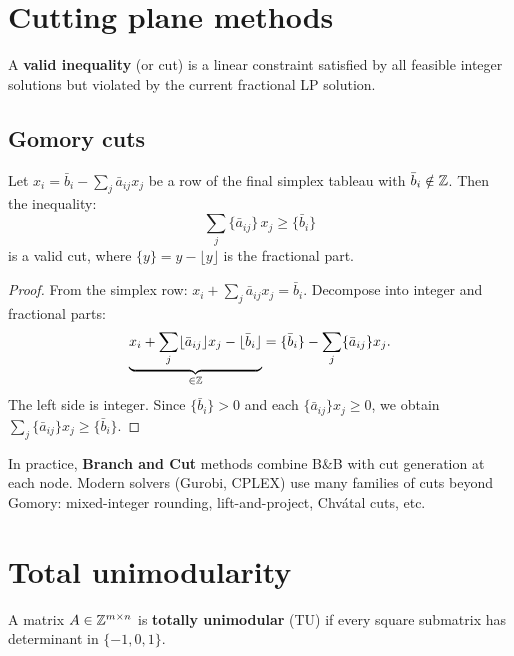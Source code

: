 \section{Cutting plane methods}

\begin{definition}
A \textbf{valid inequality} (or cut) is a linear constraint satisfied by all
feasible integer solutions but violated by the current fractional LP solution.
\end{definition}

\subsection{Gomory cuts}

\begin{theorem}
Let $x_i = \bar{b}_i - \sum_j \bar{a}_{ij} x_j$ be a row of the final
simplex tableau with $\bar{b}_i \notin \mathbb{Z}$. Then the inequality:
\[
  \sum_j \{\bar{a}_{ij}\} \, x_j \geq \{\bar{b}_i\}
\]
is a valid cut, where $\{y\} = y - \lfloor y \rfloor$ is the fractional part.
\end{theorem}

\begin{proof}
From the simplex row:
$x_i + \sum_j \bar{a}_{ij} x_j = \bar{b}_i$. Decompose into integer and
fractional parts:
\[
  \underbrace{x_i + \sum_j \lfloor \bar{a}_{ij} \rfloor x_j
  - \lfloor \bar{b}_i \rfloor}_{\in \mathbb{Z}}
  = \{\bar{b}_i\} - \sum_j \{\bar{a}_{ij}\} x_j.
\]
The left side is integer. Since $\{\bar{b}_i\} > 0$ and each
$\{\bar{a}_{ij}\} x_j \geq 0$, we obtain
$\sum_j \{\bar{a}_{ij}\} x_j \geq \{\bar{b}_i\}$.
\end{proof}

\begin{remark}
In practice, \textbf{Branch and Cut} methods combine B\&B with cut
generation at each node. Modern solvers (Gurobi, CPLEX) use many families
of cuts beyond Gomory: mixed-integer rounding, lift-and-project, Chv\'atal
cuts, etc.
\end{remark}

\section{Total unimodularity}

\begin{definition}
A matrix $A \in \mathbb{Z}^{m \times n}$ is \textbf{totally unimodular} (TU) if every
square submatrix has determinant in $\{-1, 0, 1\}$.
\end{definition}

